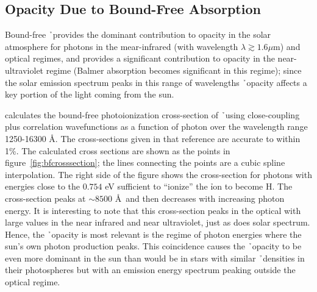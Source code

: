 \subsection{Opacity Due to Bound-Free Absorption}
Bound-free \h\ provides the dominant contribution to opacity in the
solar atmosphere for photons in the mear-infrared (with wavelength $\lambda
\gtrsim 1.6 \mu$m) and optical regimes, and provides a significant
contribution to opacity in the near-ultraviolet regime (Balmer
absorption becomes significant in this regime); since the solar
emission spectrum peaks in this range of wavelengths \h\ opacity
affects a key portion of the light coming from the sun.

\cite{wishart1979} calculates the bound-free photoionization
cross-section of \h\ using close-coupling plus correlation
wavefunctions as a function of photon
over the wavelength range 1250-16300 \AA.  The cross-sections given
in that reference are accurate to within 1\%.
The calculated cross sections are shown as the points in
figure~\ref{fig:bfcrosssection}; the lines connecting the points are a
cubic spline interpolation.  The right side of the figure shows the
cross-section for photons with energies close to the $0.754$ eV
sufficient to ``ionize'' the \h ion to become H.  The cross-section
peaks at $\sim 8500$ \AA\ and then decreases with increasing photon
energy.  It is interesting to note that this cross-section peaks in
the optical with large values in the near infrared and near
ultraviolet, just as does solar spectrum.  Hence, the \h\ opacity is
most relevant is the regime of photon energies where the sun's own
photon production peaks.  This coincidence causes the \h\ opacity to
be even more dominant in the sun than would be in stars with similar \h\
densities in their photospheres but with an emission energy spectrum
peaking outside the optical regime.
